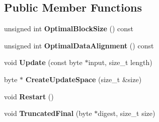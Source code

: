 \subsection*{Public Member Functions}
\begin{DoxyCompactItemize}
\item 
\hypertarget{class_iterated_hash_base_ad8ba3e6b25afbdf84f177b965229c0d9}{
unsigned int {\bfseries OptimalBlockSize} () const }
\label{class_iterated_hash_base_ad8ba3e6b25afbdf84f177b965229c0d9}

\item 
\hypertarget{class_iterated_hash_base_a9ee30253981d13564bf0d2ffa33dfc25}{
unsigned int {\bfseries OptimalDataAlignment} () const }
\label{class_iterated_hash_base_a9ee30253981d13564bf0d2ffa33dfc25}

\item 
\hypertarget{class_iterated_hash_base_a3202914349a18f79facb605d75f0d10c}{
void {\bfseries Update} (const byte $\ast$input, size\_\-t length)}
\label{class_iterated_hash_base_a3202914349a18f79facb605d75f0d10c}

\item 
\hypertarget{class_iterated_hash_base_a4c4d9bf5947311668d11f2b8d17a57e7}{
byte $\ast$ {\bfseries CreateUpdateSpace} (size\_\-t \&size)}
\label{class_iterated_hash_base_a4c4d9bf5947311668d11f2b8d17a57e7}

\item 
\hypertarget{class_iterated_hash_base_ad53da712634ea213ad047b2a68b0fe70}{
void {\bfseries Restart} ()}
\label{class_iterated_hash_base_ad53da712634ea213ad047b2a68b0fe70}

\item 
\hypertarget{class_iterated_hash_base_a2fb87191e0a4359fb9e81c71f99db600}{
void {\bfseries TruncatedFinal} (byte $\ast$digest, size\_\-t size)}
\label{class_iterated_hash_base_a2fb87191e0a4359fb9e81c71f99db600}

\end{DoxyCompactItemize}
